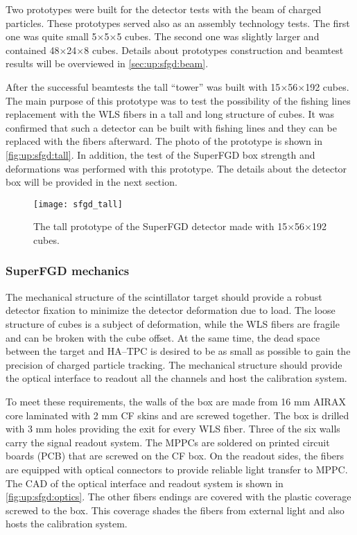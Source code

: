 \documentclass[main.tex]{subfiles}
\begin{document}
Two prototypes were built for the detector tests with the beam of charged particles. These prototypes served also as an assembly technology tests. The first one was quite small 5$\times$5$\times$5 cubes. The second one was slightly larger and contained 48$\times$24$\times$8 cubes. Details about prototypes construction and beamtest results will be overviewed in \autoref{sec:up:sfgd:beam}.

After the successful beamtests the tall ``tower'' was built with 15$\times$56$\times$192 cubes. The main purpose of this prototype was to test the possibility of the fishing lines replacement with the WLS fibers in a tall and long structure of cubes. It was confirmed that such a detector can be built with fishing lines and they can be replaced with the fibers afterward. The photo of the prototype is shown in \autoref{fig:up:sfgd:tall}. In addition, the test of the SuperFGD box strength and deformations was performed with this prototype. The details about the detector box will be provided in the next section.

\begin{figure}[!ht]
	\centering
	\texttt{[image: sfgd\_tall]}
	\caption{The tall prototype of the SuperFGD detector made with 15$\times$56$\times$192 cubes.}
	\label{fig:up:sfgd:tall}
\end{figure}

\subsubsection{SuperFGD mechanics}
The mechanical structure of the scintillator target should provide a robust detector fixation to minimize the detector deformation due to load. The loose structure of cubes is a subject of deformation, while the WLS fibers are fragile and can be broken with the cube offset. At the same time, the dead space between the target and HA--TPC is desired to be as small as possible to gain the precision of charged particle tracking. The mechanical structure should provide the optical interface to readout all the channels and host the calibration system.

To meet these requirements, the walls of the box are made from 16 mm AIRAX core laminated with 2 mm CF skins and are screwed together. The box is drilled with 3 mm holes providing the exit for every WLS fiber. Three of the six walls carry the signal readout system. The MPPCs are soldered on printed circuit boards (PCB) that are screwed on the CF box. On the readout sides, the fibers are equipped with optical connectors to provide reliable light transfer to MPPC. The CAD of the optical interface and readout system is shown in \autoref{fig:up:sfgd:optics}. The other fibers endings are covered with the plastic coverage screwed to the box. This coverage shades the fibers from external light and also hosts the calibration system.
\end{document}
